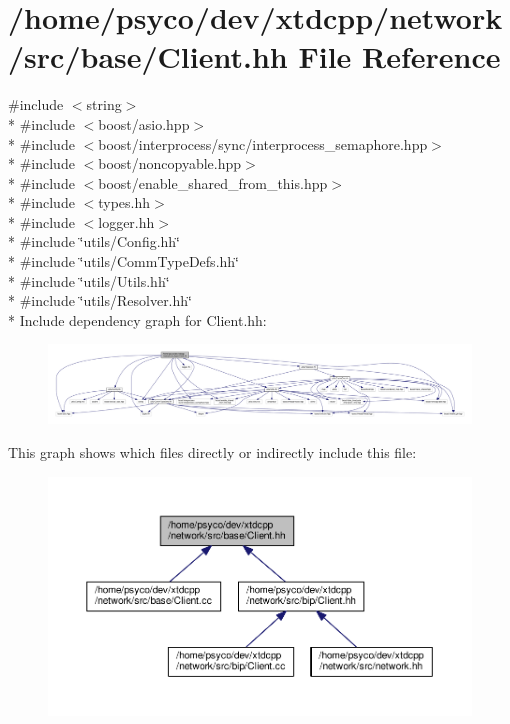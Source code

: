 \hypertarget{base_2Client_8hh}{}\section{/home/psyco/dev/xtdcpp/network/src/base/\+Client.hh File Reference}
\label{base_2Client_8hh}
{\ttfamily \#include $<$string$>$}\\*
{\ttfamily \#include $<$boost/asio.\+hpp$>$}\\*
{\ttfamily \#include $<$boost/interprocess/sync/interprocess\+\_\+semaphore.\+hpp$>$}\\*
{\ttfamily \#include $<$boost/noncopyable.\+hpp$>$}\\*
{\ttfamily \#include $<$boost/enable\+\_\+shared\+\_\+from\+\_\+this.\+hpp$>$}\\*
{\ttfamily \#include $<$types.\+hh$>$}\\*
{\ttfamily \#include $<$logger.\+hh$>$}\\*
{\ttfamily \#include \char`\"{}utils/\+Config.\+hh\char`\"{}}\\*
{\ttfamily \#include \char`\"{}utils/\+Comm\+Type\+Defs.\+hh\char`\"{}}\\*
{\ttfamily \#include \char`\"{}utils/\+Utils.\+hh\char`\"{}}\\*
{\ttfamily \#include \char`\"{}utils/\+Resolver.\+hh\char`\"{}}\\*
Include dependency graph for Client.\+hh\+:
\nopagebreak
\begin{figure}[H]
\begin{center}
\leavevmode
\includegraphics[width=350pt]{base_2Client_8hh__incl}
\end{center}
\end{figure}
This graph shows which files directly or indirectly include this file\+:
\nopagebreak
\begin{figure}[H]
\begin{center}
\leavevmode
\includegraphics[width=350pt]{base_2Client_8hh__dep__incl}
\end{center}
\end{figure}
